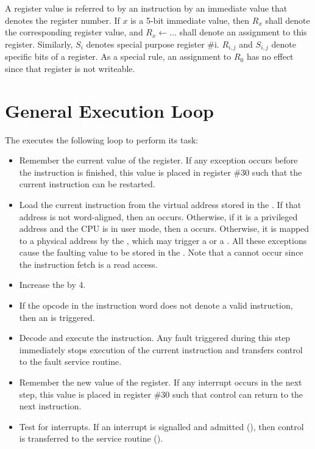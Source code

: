 A register value is referred to by an instruction by an immediate value that denotes the register number. If $x$ is a 5-bit immediate value, then $R_x$ shall denote the corresponding register value, and $R_x \leftarrow ...$ shall denote an assignment to this register. Similarly, $S_i$ denotes special purpose register \#i. $R_{i,j}$ and $S_{i,j}$ denote specific bits of a register. As a special rule, an assignment to $R_0$ has no effect since that register is not writeable.

\section{General Execution Loop}

The \eco executes the following loop to perform its task:
\begin{itemize}
\item Remember the current value of the \pc register. If any exception occurs before the instruction is finished, this value is placed in register \#30 such that the current instruction can be restarted.
\item Load the current instruction from the virtual address stored in the \pcx. If that address is not word-aligned, then an  occurs. Otherwise, if it is a privileged address and the CPU is in user mode, then a  occurs. Otherwise, it is mapped to a physical address by the \mmux, which may trigger a  or a . All these exceptions cause the faulting \pc value to be stored in the . Note that a  cannot occur since the instruction fetch is a read access.
\item Increase the \pc by 4.
\item If the opcode in the instruction word does not denote a valid instruction, then an  is triggered.
\item Decode and execute the instruction. Any fault triggered during this step immediately stops execution of the current instruction and transfers control to the fault service routine.
\item Remember the new value of the \pc register. If any interrupt occurs in the next step, this value is placed in register \#30 such that control can return to the next instruction.
\item Test for interrupts. If an interrupt is signalled and admitted (), then control is transferred to the service routine ().
\end{itemize}





